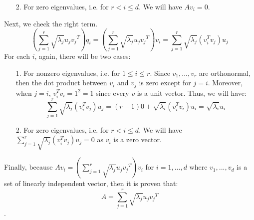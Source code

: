 \documentclass[twoside]{homework}
\begin{document}
\begin{itemize}
\begin{itemize}
        \item[2.] For zero eigenvalues, i.e. for $r<i\leq{d}$. We will have $ Av_i = 0$.
    \end{itemize}
    Next, we check the right term.
    $$(\sum_{j=1}^r\sqrt{{\lambda}_j}u_j{v_j}^T)q_i = (\sum_{j=1}^r\sqrt{{\lambda}_j}u_j{v_j}^T)v_i = \sum_{j=1}^r\sqrt{{\lambda}_j}(v_i^Tv_j)u_j$$
    For each $i$, again, there will be two cases:
    \begin{itemize}
        \item[1.] For nonzero eigenvalues, i.e. for $1\leq{i}\leq{r}$. Since $v_1, ..., v_r$ are orthonormal, then the dot product between $v_i$ and $v_j$ is zero except for $j=i$. Moreover, when $j=i$, $v_i^Tv_i=1^2=1$ since every $v$ is a unit vector. Thus, we will have: $$\sum_{j=1}^r\sqrt{{\lambda}_j}(v_i^Tv_j)u_j = (r-1)0 + \sqrt{\lambda_i}(v_i^Tv_i)u_i=\sqrt{\lambda_i}u_i$$
        \item[2.] For zero eigenvalues, i.e. for $r<i\leq{d}$. We will have $\sum_{j=1}^r\sqrt{{\lambda}_j}(v_i^Tv_j)u_j = 0$ as $v_i$ is a zero vector.
    \end{itemize}
    Finally, because $Av_i=(\sum_{j=1}^r\sqrt{{\lambda}_j}u_j{v_j}^T)v_i$ for $i=1,...,d$ where $v_1,...,v_d$ is a set of linearly independent vector, then it is proven that:
    $$A=\sum_{j=1}^r\sqrt{{\lambda}_j}u_j{v_j}^T$$.
\end{itemize}
\newpage
\end{document}
